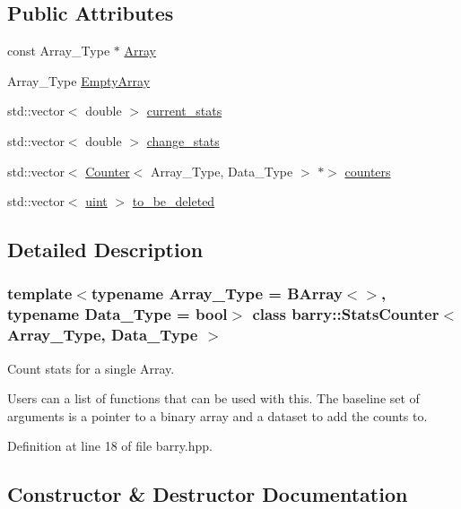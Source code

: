 \subsection*{Public Attributes}
\begin{DoxyCompactItemize}
\item 
const Array\+\_\+\+Type $\ast$ \hyperlink{classbarry_1_1_stats_counter_a4a963a5edf23d0527e1ef87c52c04a97}{Array}
\item 
Array\+\_\+\+Type \hyperlink{classbarry_1_1_stats_counter_ad78463fadfa385a69121c40fdc8fd193}{Empty\+Array}
\item 
std\+::vector$<$ double $>$ \hyperlink{classbarry_1_1_stats_counter_ad99718884cffbeca3cb98d574f6956a1}{current\+\_\+stats}
\item 
std\+::vector$<$ double $>$ \hyperlink{classbarry_1_1_stats_counter_a90b8fddb02b2628cc8d71986f8cdf0ed}{change\+\_\+stats}
\item 
std\+::vector$<$ \hyperlink{classbarry_1_1_counter}{Counter}$<$ Array\+\_\+\+Type, Data\+\_\+\+Type $>$ $\ast$$>$ \hyperlink{classbarry_1_1_stats_counter_a691b13aff3386ec6519f0712fa65c8f7}{counters}
\item 
std\+::vector$<$ \hyperlink{namespacebarry_a11dfc53ddb4672278319aa04f1e09a6c}{uint} $>$ \hyperlink{classbarry_1_1_stats_counter_a332d678489f13664c0aad12cfd1aa725}{to\+\_\+be\+\_\+deleted}
\end{DoxyCompactItemize}


\subsection{Detailed Description}
\subsubsection*{template$<$typename Array\+\_\+\+Type = B\+Array$<$$>$, typename Data\+\_\+\+Type = bool$>$\newline
class barry\+::\+Stats\+Counter$<$ Array\+\_\+\+Type, Data\+\_\+\+Type $>$}

Count stats for a single Array. 

Users can a list of functions that can be used with this. The baseline set of arguments is a pointer to a binary array and a dataset to add the counts to. 

Definition at line 18 of file barry.\+hpp.



\subsection{Constructor \& Destructor Documentation}
\mbox{\label{classbarry_1_1_stats_counter_a43e9fa90ef0b1fb716f0e75d1b803ef1}} 
